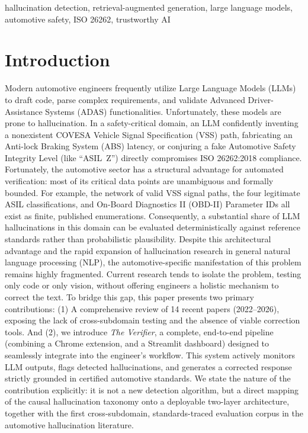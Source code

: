 \documentclass[conference,a4paper]{IEEEtran}
\begin{document}
\begin{IEEEkeywords}
hallucination detection, retrieval-augmented generation, large language models, automotive safety, ISO 26262, trustworthy AI
\end{IEEEkeywords}
\section{Introduction}
Modern automotive engineers frequently utilize Large Language Models (LLMs) to draft code, parse complex requirements, and validate Advanced Driver-Assistance Systems (ADAS) functionalities. Unfortunately, these models are prone to hallucination. In a safety-critical domain, an LLM confidently inventing a nonexistent COVESA Vehicle Signal Specification (VSS) path, fabricating an Anti-lock Braking System (ABS) latency, or conjuring a fake Automotive Safety Integrity Level (like ``ASIL~Z'') directly compromises ISO 26262:2018 compliance.
Fortunately, the automotive sector has a structural advantage for automated verification: most of its critical data points are unambiguous and formally bounded. For example, the network of valid VSS signal paths, the four legitimate ASIL classifications, and On-Board Diagnostics II (OBD-II) Parameter IDs all exist as finite, published enumerations. Consequently, a substantial share of LLM hallucinations in this domain can be evaluated deterministically against reference standards rather than probabilistic plausibility.
Despite this architectural advantage and the rapid expansion of hallucination research in general natural language processing (NLP), the automotive-specific manifestation of this problem remains highly fragmented. Current research tends to isolate the problem, testing only code or only vision, without offering engineers a holistic mechanism to correct the text.
To bridge this gap, this paper presents two primary contributions: (1) A comprehensive review of 14 recent papers (2022--2026), exposing the lack of cross-subdomain testing and the absence of viable correction tools. And (2), we introduce \textit{The Verifier}, a complete, end-to-end pipeline (combining a Chrome extension, and a Streamlit dashboard) designed to seamlessly integrate into the engineer's workflow. This system actively monitors LLM outputs, flags detected hallucinations, and generates a corrected response strictly grounded in certified automotive standards. We state the nature of the contribution explicitly: it is not a new detection algorithm, but a direct mapping of the causal hallucination taxonomy onto a deployable two-layer architecture, together with the first cross-subdomain, standards-traced evaluation corpus in the automotive hallucination literature.
\end{document}
